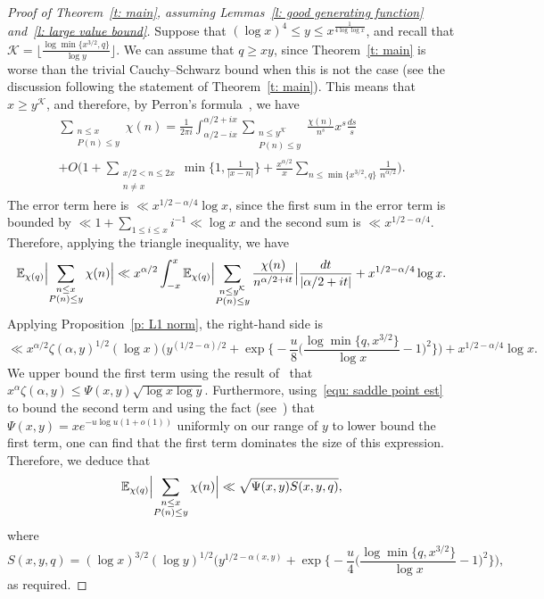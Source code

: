 \documentclass[a4paper,12pt,reqno]{amsart}
\newcommand{\E}{\mathbb{E}}
\begin{document}
\begin{proof}[Proof of Theorem~\ref{t: main}, assuming Lemmas~\ref{l: good generating function} and~\ref{l: large value bound}]
Suppose that $(\log x)^4 \leq y \leq x^{\frac{1}{4 \log \log x}}$, and recall that $\mathcal{K} = \lfloor \frac{\log \min \{ x^{3/2}, q \}}{\log y} \rfloor$. We can assume that $q \geq xy$, since Theorem~\ref{t: main} is worse than the trivial Cauchy--Schwarz bound when this is not the case (see the discussion following the statement of Theorem~\ref{t: main}). This means that $x \geq y^{\mathcal{K}}$, and therefore, by Perron's formula~\cite[Corollary~5.3]{MV2007}, we have
\begin{multline*}
\sum_{\substack{n \leq x \\ P(n) \leq y}} \chi(n) = \frac{1}{2 \pi i} \int_{\alpha/2 - ix}^{\alpha/2 + ix} \sum_{\substack{n \leq y^{\mathcal{K}} \\ P(n) \leq y}} \frac{\chi(n)}{n^s} x^s \frac{ds}{s} \\  
+ O \biggl( 1 + \sum_{\substack{x/2 < n \leq 2x \\ n \neq x}} \min \biggl\{ 1, \frac{1}{|x-n|} \biggr\} + \frac{x^{\alpha/2}}{x} \sum_{n \leq \min \{x^{3/2}, q\}} \frac{1}{n^{\alpha/2}} \biggr).
\end{multline*}
The error term here is $\ll x^{1/2 - \alpha/4} \log x$, since the first sum in the error term is bounded by $\ll 1 +  \sum_{1\le i \le x}i^{-1}\ll \log x$ and the second sum is $\ll x^{1/2-\alpha/4}$. Therefore, applying the triangle inequality, we have
\[
\E_{\chi (q)} \Bigl| \sum_{\substack{n \leq x \\ P(n) \leq y}} \chi(n) \Bigr| \ll x^{\alpha / 2} \int_{-x}^{x} \E_{\chi (q)} \Bigl| \sum_{\substack{n \leq y^{\mathcal{K}} \\ P(n) \leq y}} \frac{\chi(n)}{n^{\alpha / 2 + it}} \Bigr| \frac{dt}{|\alpha / 2 + it|} + x^{1/2 - \alpha/4} \log x .
\]
Applying Proposition~\ref{p: L1 norm}, the right-hand side is
\[
\ll x^{\alpha/2}  \zeta (\alpha, y)^{1/2} (\log x) \biggl(y^{(1/2 - \alpha)/2} + \exp \biggl\{ - \frac{u}{8} \biggl( \frac{\log \min\{ q, x^{3/2} \}}{\log x} - 1 \biggr)^2 \biggr\} \biggr) + x^{1/2 - \alpha/4} \log x .
\]
We upper bound the first term using the result of~\citet[Theorem~1]{HildTen86} that $x^{\alpha} \zeta (\alpha, y) \leq \Psi(x,y) \sqrt{\log x \log y}$. Furthermore, using~\eqref{equ: saddle point est} to bound the second term and using the fact (see~\cite[Corollary to Theorem~3.1]{CEP}) that $\Psi(x,y) = x e^{-u \log u (1+o(1))}$ uniformly on our range of $y$ to lower bound the first term, one can find that the first term dominates the size of this expression. Therefore, we deduce that
\[
\E_{\chi (q)} \Bigl| \sum_{\substack{n \leq x \\ P(n) \leq y}} \chi(n) \Bigr| \ll \sqrt{\Psi(x,y) S(x,y,q)},
\]
where
\[
S(x,y,q) = (\log x)^{3/2} (\log y)^{1/2} \biggl( y^{1/2 - \alpha(x,y)} +  \exp \biggl\{ - \frac{u}{4} \biggl( \frac{\log \min\{ q, x^{3/2} \}}{\log x} - 1 \biggr)^2  \biggr\} \biggr),
\]
as required.
\end{proof}
\end{document}
